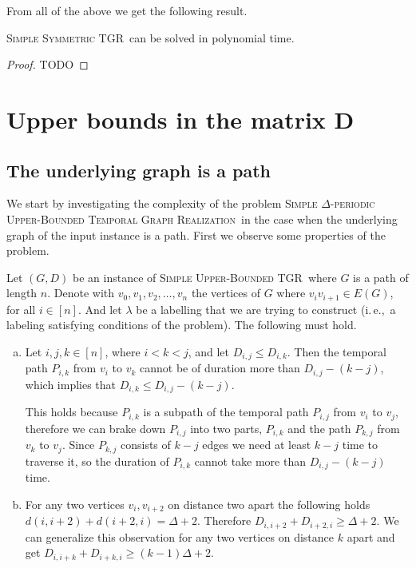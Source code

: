 \documentclass[a4paper,UKenglish,cleveref, autoref, thm-restate]{lipics-v2021}
\newcommand{\ie}{i.\,e.,\ }
\newcommand{\deltaSymExact}{\textsc{Simple Symmetric TGR}}
\newcommand{\DeltaUpperBoundLong}{\textsc{Simple $\Delta$-periodic Upper-Bounded Temporal Graph Realization}}
\newcommand{\deltaUpperBound}{\textsc{Simple Upper-Bounded TGR}}
\begin{document}
From all of the above we get the following result.
\begin{theorem}
	\deltaSymExact\ can be solved in polynomial time.
\end{theorem}
\begin{proof}
	TODO
\end{proof}

\section{Upper bounds in the matrix D}

\subsection{The underlying graph is a path}
We start by investigating the complexity of the problem \DeltaUpperBoundLong\ in the case when the underlying graph of the input instance is a path.
First we observe some properties of the problem.

Let $(G,D)$ be an instance of \deltaUpperBound\, where $G$ is a path of length $n$.
Denote with $v_0,v_1, v_2, \dots, v_n$ the vertices of $G$ where $v_{i}v_{i+1} \in E(G)$, for all $i \in [n]$.
And let $\lambda$ be a labelling that we are trying to construct (\ie a labeling satisfying conditions of the problem).
The following must hold.
\begin{enumerate}[(a)]
	\item \label{path:enum-1}
 Let $i,j,k \in [n]$, where $i < k < j$, and let $D_{i,j} \leq D_{i,k}$. 
 Then the temporal path $P_{i,k}$ from $v_i$ to $v_k$ cannot be of duration more than $D_{i,j} - (k-j)$,
 which implies that $D_{i,k} \leq D_{i,j} - (k-j)$.
 
 This holds because $P_{i,k}$ is a subpath of the temporal path $P_{i,j}$ from $v_i$ to $v_j$,
 therefore we can brake down $P_{i,j}$ into two parts, $P_{i,k}$ and the path $P_{k,j}$ from $v_k$ to $v_j$.
 Since $P_{k,j}$ consists of $k-j$ edges we need at least $k-j$ time to traverse it, so the duration of $P_{i,k}$ cannot take more than $D_{i,j} - (k-j)$ time.

    \item \label{path:enum-2}
     For any two vertices $v_i, v_{i+2}$ on distance two apart the following holds $d(i, i+2) + d(i+2, i) = \Delta + 2$.
     Therefore $D_{i,i+2} + D_{i+2,i} \geq \Delta + 2$.
     We can generalize this observation for any two vertices on distance $k$ apart and get 
     $D_{i,i+k} + D_{i+k,i} \geq (k-1) \Delta + 2$.

\end{enumerate}
\end{document}
